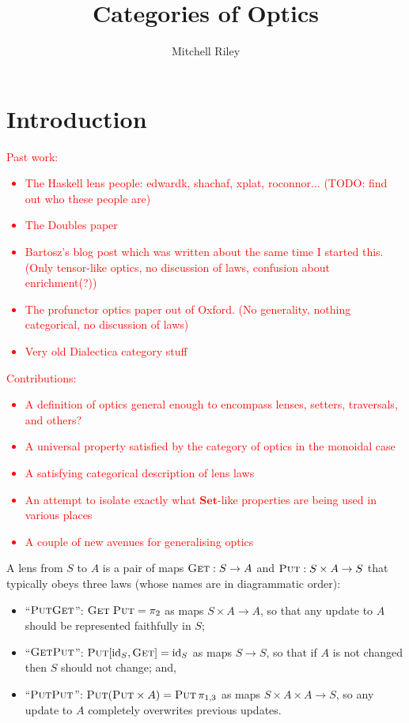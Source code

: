 \documentclass[11pt,a4paper]{article}
\title{Categories of Optics}
\author{Mitchell Riley}
\affil{Wesleyan University \\ \texttt{mvriley@wesleyan.edu}}
\theoremstyle{plain}
\theoremstyle{definition}
\newcommand{\Set}{\mathbf{Set}}
\newcommand{\id}{\mathrm{id}}
\newcommand{\fget}{\textsc{Get}}
\newcommand{\fput}{\textsc{Put}}
\newcommand{\todo}[1]{\textcolor{red}{\small #1}}
\begin{document}
\maketitle

\section{Introduction}

\todo{Past work:
\begin{itemize}
\item The Haskell lens people: edwardk, shachaf, xplat, roconnor... (TODO: find out who these people are)
\item The Doubles paper
\item Bartosz's blog post which was written about the same time I started this. (Only tensor-like optics, no discussion of laws, confusion about enrichment(?))
\item The profunctor optics paper out of Oxford. (No generality, nothing categorical, no discussion of laws)
\item Very old Dialectica category stuff
\end{itemize}
}

\todo{Contributions:
\begin{itemize}
\item A definition of optics general enough to encompass lenses, setters, traversals, and others?
\item A universal property satisfied by the category of optics in the monoidal case
\item A satisfying categorical description of lens laws
\item An attempt to isolate exactly what $\Set$-like properties are being used in various places
\item A couple of new avenues for generalising optics
\end{itemize}
}

A lens from $S$ to $A$ is a pair of maps $\fget : S \to A$ and $\fput : S \times A \to S$ that typically obeys three laws (whose names are in diagrammatic order):
\begin{itemize}
\item ``$\fput\fget$'': $\fget \; \fput = \pi_2$ as maps $S \times A \to A$, so that any update to $A$ should be represented faithfully in $S$;
\item ``$\fget\fput$'': $\fput [\id_S, \fget] = \id_S$ as maps $S \to S$, so that if $A$ is not changed then $S$ should not change; and,
\item ``$\fput\fput$'': $\fput (\fput \times A) = \fput \, \pi_{1, 3}$ as maps $S \times A \times A \to S$, so any update to $A$ completely overwrites previous updates.
\end{itemize}
\end{document}
